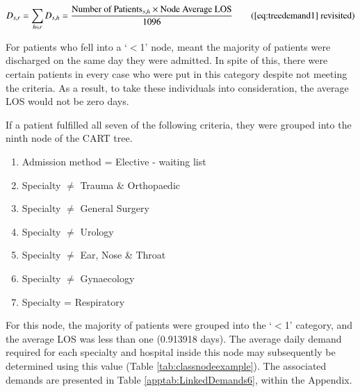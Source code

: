 \documentclass[../thesis.tex]{subfiles}
\begin{document}
\begin{equation}
        D_{s,r} = \sum\limits_{h \in r} D_{s,h} = \frac{\text{Number of Patients}_{s,h}\times\text{Node Average LOS}}{1096} \tag{\ref{eq:treedemand1} revisited}\\
\end{equation}

For patients who fell into a `$<$1' node, meant the majority of patients were discharged on the same day they were admitted. In spite of this, there were certain patients in every case who were put in this category despite not meeting the criteria. As a result, to take these individuals into consideration, the average LOS would not be zero days.

If a patient fulfilled all seven of the following criteria, they were grouped into the ninth node of the CART tree.
\begin{enumerate}
    \item Admission method = Elective - waiting list
    \item Specialty $\neq$ Trauma \& Orthopaedic
    \item Specialty $\neq$ General Surgery
    \item Specialty $\neq$ Urology
    \item Specialty $\neq$ Ear, Nose \& Throat
    \item Specialty $\neq$ Gynaecology
    \item Specialty = Respiratory
\end{enumerate}

For this node, the majority of patients were grouped into the `$<$1' category, and the average LOS was less than one (0.913918 days). The average daily demand required for each specialty and hospital inside this node may subsequently be determined using this value (Table \ref{tab:classnodeexample}). The associated demands are presented in Table \ref{apptab:LinkedDemands6}, within the Appendix.

\begin{table}[h!]
    \centering{}
    \caption{The count of admissions and the associated average LOS for each hospital and specialty within the ninth node of the classification tree. The average daily bed demand has additionally been calculated.}
    \label{tab:classnodeexample}
\end{table}
\end{document}
